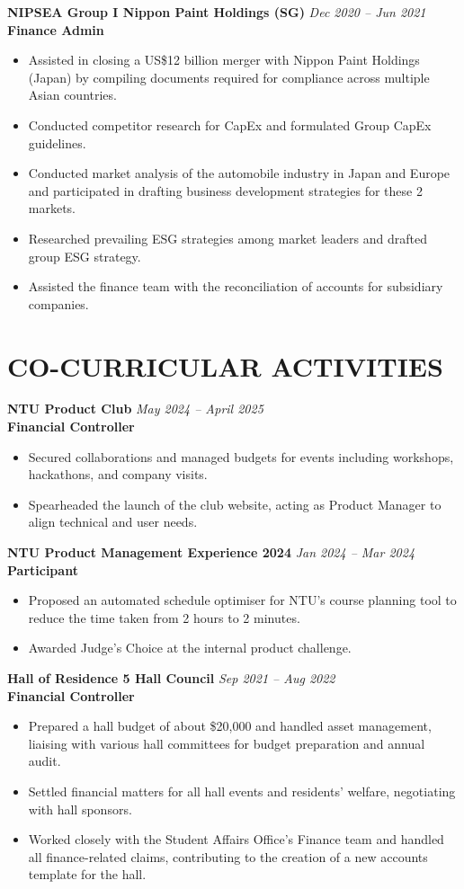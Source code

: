 \documentclass[a4paper,10pt]{article}
\newcommand{\resumeHeading}[4]{%
  \vspace{3pt}
  \textbf{#1} \hfill \textit{#2} \\
  \textbf{#3} \hfill \textit{#4}
  \vspace{1pt}
}
\begin{document}
\resumeHeading{NIPSEA Group I Nippon Paint Holdings (SG)}{Dec 2020 -- Jun 2021}{Finance Admin}{}
\begin{itemize}
  \item Assisted in closing a US\$12 billion merger with Nippon Paint Holdings (Japan) by compiling documents required for compliance across multiple Asian countries.
  \item Conducted competitor research for CapEx and formulated Group CapEx guidelines.
  \item Conducted market analysis of the automobile industry in Japan and Europe and participated in drafting business development strategies for these 2 markets.
  \item Researched prevailing ESG strategies among market leaders and drafted group ESG strategy.
  \item Assisted the finance team with the reconciliation of accounts for subsidiary companies.
\end{itemize}

\section{CO-CURRICULAR ACTIVITIES}

\resumeHeading{NTU Product Club}{May 2024 -- April 2025}{Financial Controller}{}
\begin{itemize}
  \item Secured collaborations and managed budgets for events including workshops, hackathons, and company visits.
  \item Spearheaded the launch of the club website, acting as Product Manager to align technical and user needs.
\end{itemize}

\resumeHeading{NTU Product Management Experience 2024}{Jan 2024 -- Mar 2024}{Participant}{}
\begin{itemize}
  \item Proposed an automated schedule optimiser for NTU's course planning tool to reduce the time taken from 2 hours to 2 minutes.
  \item Awarded Judge's Choice at the internal product challenge.
\end{itemize}

\resumeHeading{Hall of Residence 5 Hall Council}{Sep 2021 -- Aug 2022}{Financial Controller}{}
\begin{itemize}
  \item Prepared a hall budget of about \$20,000 and handled asset management, liaising with various hall committees for budget preparation and annual audit.
  \item Settled financial matters for all hall events and residents' welfare, negotiating with hall sponsors.
  \item Worked closely with the Student Affairs Office's Finance team and handled all finance-related claims, contributing to the creation of a new accounts template for the hall.
\end{itemize}
\end{document}
